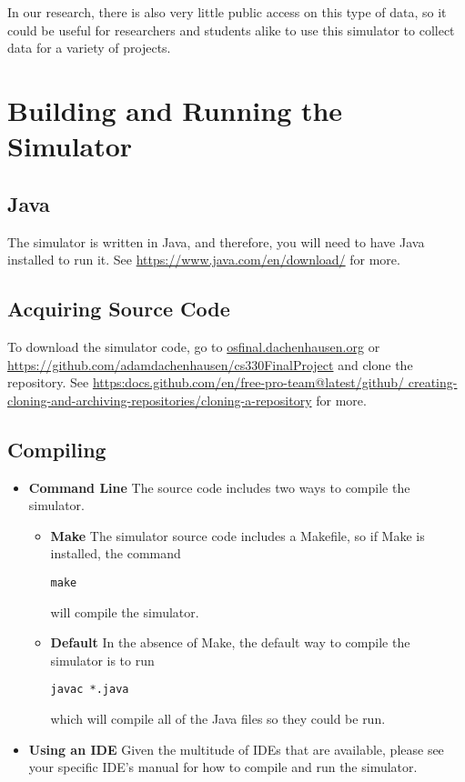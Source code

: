 \documentclass[12pt]{article}
\begin{document}
In our research, there is also very little public access on this type of data, so
it could be useful for researchers and students alike to use this simulator to collect
data for a variety of projects.

\section{Building and Running the Simulator}
\label{sec:build}

\subsection{Java}
The simulator is written in Java, and therefore, you will need to have
Java installed to run it. See \url{https://www.java.com/en/download/}
 for more.

\subsection{Acquiring Source Code}
To download the simulator code, go to \url{osfinal.dachenhausen.org}
or \url{https://github.com/adamdachenhausen/cs330FinalProject} and clone the repository.
See \url{https:docs.github.com/en/free-pro-team@latest/github/
creating-cloning-and-archiving-repositories/cloning-a-repository} for more.

\subsection{Compiling}
\begin{itemize}

\item \textbf{Command Line}
  The source code includes two ways to compile the simulator.
  \begin{itemize}
  \item \textbf{Make}
  The simulator source code includes a Makefile, so if Make is installed, the command
  \begin{verbatim}make\end{verbatim}
  will compile the simulator.
  \item \textbf{Default}
  In the absence of Make, the default way to compile the simulator is to run  
  \begin{verbatim}javac *.java\end{verbatim}
  which will compile all of the Java files so they could be run.
  \end{itemize}
\item \textbf{Using an IDE}
  Given the multitude of IDEs that are available, please see your
  specific IDE's manual for how to compile and run the simulator.
  
\end{itemize}
\end{document}
